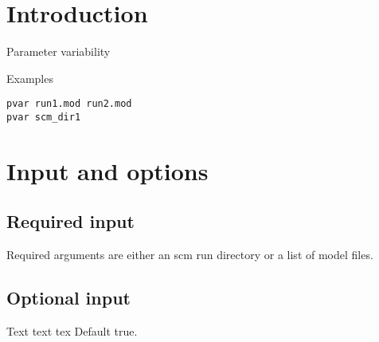 



\maketitle


\section{Introduction}
Parameter variability

Examples
\begin{verbatim}
pvar run1.mod run2.mod
pvar scm_dir1
\end{verbatim}

\section{Input and options}

\subsection{Required input}
Required arguments are either an scm run directory or a list of model files.

\subsection{Optional input}

\begin{optionlist}
Text text tex
\nextopt
{}
Default true.
\nextopt
\end{optionlist}


